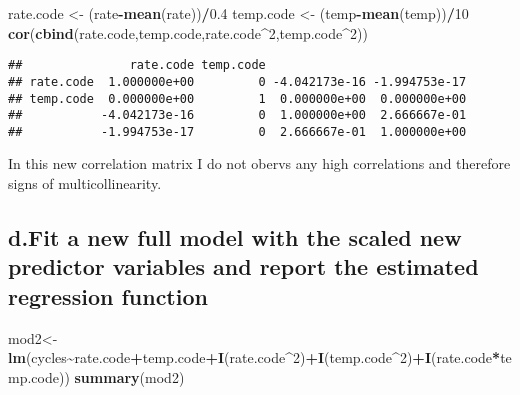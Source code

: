 \documentclass[
]{article}
\newenvironment{Shaded}{\begin{snugshade}}{\end{snugshade}}
\newcommand{\DecValTok}[1]{\textcolor[rgb]{0.00,0.00,0.81}{#1}}
\newcommand{\FloatTok}[1]{\textcolor[rgb]{0.00,0.00,0.81}{#1}}
\newcommand{\FunctionTok}[1]{\textcolor[rgb]{0.13,0.29,0.53}{\textbf{#1}}}
\newcommand{\NormalTok}[1]{#1}
\newcommand{\OtherTok}[1]{\textcolor[rgb]{0.56,0.35,0.01}{#1}}
\newcommand{\SpecialCharTok}[1]{\textcolor[rgb]{0.81,0.36,0.00}{\textbf{#1}}}
\begin{document}
\begin{Shaded}
\begin{Highlighting}[]
\NormalTok{rate.code }\OtherTok{\textless{}{-}}\NormalTok{ (rate}\SpecialCharTok{{-}}\FunctionTok{mean}\NormalTok{(rate))}\SpecialCharTok{/}\FloatTok{0.4}
\NormalTok{temp.code }\OtherTok{\textless{}{-}}\NormalTok{ (temp}\SpecialCharTok{{-}}\FunctionTok{mean}\NormalTok{(temp))}\SpecialCharTok{/}\DecValTok{10}
\FunctionTok{cor}\NormalTok{(}\FunctionTok{cbind}\NormalTok{(rate.code,temp.code,rate.code}\SpecialCharTok{\^{}}\DecValTok{2}\NormalTok{,temp.code}\SpecialCharTok{\^{}}\DecValTok{2}\NormalTok{))}
\end{Highlighting}
\end{Shaded}

\begin{verbatim}
##               rate.code temp.code                            
## rate.code  1.000000e+00         0 -4.042173e-16 -1.994753e-17
## temp.code  0.000000e+00         1  0.000000e+00  0.000000e+00
##           -4.042173e-16         0  1.000000e+00  2.666667e-01
##           -1.994753e-17         0  2.666667e-01  1.000000e+00
\end{verbatim}

In this new correlation matrix I do not obervs any high correlations and
therefore signs of multicollinearity.

\hypertarget{d.fit-a-new-full-model-with-the-scaled-new-predictor-variables-and-report-the-estimated-regression-function}{%
\subsection{d.Fit a new full model with the scaled new predictor
variables and report the estimated regression
function}\label{d.fit-a-new-full-model-with-the-scaled-new-predictor-variables-and-report-the-estimated-regression-function}}

\begin{Shaded}
\begin{Highlighting}[]
\NormalTok{mod2}\OtherTok{\textless{}{-}}\FunctionTok{lm}\NormalTok{(cycles}\SpecialCharTok{\textasciitilde{}}\NormalTok{rate.code}\SpecialCharTok{+}\NormalTok{temp.code}\SpecialCharTok{+}\FunctionTok{I}\NormalTok{(rate.code}\SpecialCharTok{\^{}}\DecValTok{2}\NormalTok{)}\SpecialCharTok{+}\FunctionTok{I}\NormalTok{(temp.code}\SpecialCharTok{\^{}}\DecValTok{2}\NormalTok{)}\SpecialCharTok{+}\FunctionTok{I}\NormalTok{(rate.code}\SpecialCharTok{*}\NormalTok{temp.code))}
\FunctionTok{summary}\NormalTok{(mod2)}
\end{Highlighting}
\end{Shaded}
\end{document}
